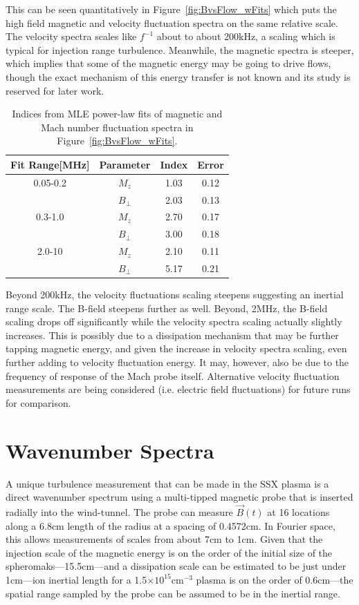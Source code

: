 \documentclass[aip,prl,amsmath,amssymb,reprint,superscriptaddress]{revtex4-1} %
\begin{document}
This can be seen quantitatively in Figure~\ref{fig:BvsFlow_wFits} which puts the high field magnetic and velocity fluctuation spectra on the same relative scale. The velocity spectra scales like $f^{-1}$ about to about 200kHz, a scaling which is typical for injection range turbulence. Meanwhile, the magnetic spectra is steeper, which implies that some of the magnetic energy may be going to drive flows, though the exact mechanism of this energy transfer is not known and its study is reserved for later work.

\begin{table}
\caption{\label{tab:Bindices}Indices from MLE power-law fits of magnetic and Mach number fluctuation spectra in Figure~\ref{fig:BvsFlow_wFits}.}
\begin{tabular}{cccc}
\toprule
Fit Range[MHz]	&	Parameter		&	Index	&Error\\
\hline
0.05-0.2				& $M_{z}$			& 1.03	&0.12\\
								& $B_{\perp}$	& 2.03  &0.13\\
\hline
0.3-1.0					& $M_{z}$			& 2.70	&0.17\\
								& $B_{\perp}$	& 3.00  &0.18\\
\hline
2.0-10					& $M_{z}$			& 2.10	&0.11\\
								& $B_{\perp}$	& 5.17  &0.21\\
\hline
\end{tabular}
\end{table}

Beyond 200kHz, the velocity fluctuations scaling steepens suggesting an inertial range scale. The B-field steepens further as well. Beyond, 2MHz, the B-field scaling drops off significantly while the velocity spectra scaling actually slightly increases. This is possibly due to a dissipation mechanism that may be further tapping magnetic energy, and given the increase in velocity spectra scaling, even further adding to velocity fluctuation energy. It may, however, also be due to the frequency of response of the Mach probe itself. Alternative velocity fluctuation measurements are being considered (i.e. electric field fluctuations) for future runs for comparison.

\section{Wavenumber Spectra}

A unique turbulence measurement that can be made in the SSX plasma is a direct wavenumber spectrum using a multi-tipped magnetic probe that is inserted radially into the wind-tunnel. The probe can measure $\vec{B}(t)$ at 16 locations along a 6.8cm length of the radius at a spacing of 0.4572cm. In Fourier space, this allows measurements of scales from about 7cm to 1cm. Given that the injection scale of the magnetic energy is on the order of the initial size of the spheromaks---15.5cm---and a dissipation scale can be estimated to be just under 1cm---ion inertial length for a 1.5$\times 10^{15}$cm$^{-3}$ plasma is on the order of 0.6cm---the spatial range sampled by the probe can be assumed to be in the inertial range.
\end{document}

